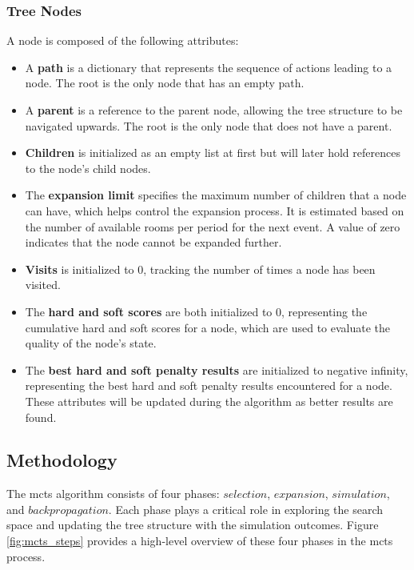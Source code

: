 \subsubsection{Tree Nodes}

A node is composed of the following attributes:

\begin{itemize}
\item A \textbf{path} is a dictionary that represents the sequence of actions leading to a node. The root is the only node that has an empty path.

\item A \textbf{parent} is a reference to the parent node, allowing the tree structure to be navigated upwards. The root is the only node that does not have a parent.

\item \textbf{Children} is initialized as an empty list at first but will later hold references to the node's child nodes. 

\item The \textbf{expansion limit} specifies the maximum number of children that a node can have, which helps control the expansion process. It is estimated based on the number of available rooms per period for the next event. A value of zero indicates that the node cannot be expanded further.

\item \textbf{Visits} is initialized to 0, tracking the number of times a node has been visited.

\item The \textbf{hard and soft scores} are both initialized to 0, representing the cumulative hard and soft scores for a node, which are used to evaluate the quality of the node's state.

\item The \textbf{best hard and soft penalty results} are initialized to negative infinity, representing the best hard and soft penalty results encountered for a node. These attributes will be updated during the algorithm as better results are found. 
\end{itemize}

\subsection{Methodology}

The \ac{mcts} algorithm consists of four phases: \(selection\), \(expansion\), \(simulation\), and \(backpropagation\). Each phase plays a critical role in exploring the search space and updating the tree structure with the simulation outcomes. Figure \ref{fig:mcts_steps} provides a high-level overview of these four phases in the \ac{mcts} process.


